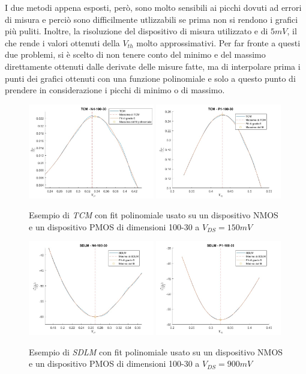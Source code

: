 \documentclass[12pt, letterpaper]{book}
\begin{document}
I due metodi appena esposti, però, sono molto sensibili ai picchi dovuti ad errori di misura e perciò sono difficilmente utlizzabili se prima non si rendono i grafici più puliti. Inoltre, la risoluzione del dispositivo di misura utilizzato e di $5 mV$, il che rende i valori ottenuti della $V_{th}$ molto approssimativi.
Per far fronte a questi due problemi, si è scelto di non tenere conto del minimo e del massimo direttamente ottenuti dalle derivate delle misure fatte, ma di interpolare prima i punti dei grafici ottenuti con una funzione polinomiale e solo a questo punto di prendere in considerazione i picchi di minimo o di massimo. \\

\begin{figure}[h!]
\centering
 \includegraphics[width=0.49\textwidth]{TCM-N4-100-30}
 \includegraphics[width=0.49\textwidth]{TCM-P1-100-30}
 \caption{Esempio di \emph{TCM} con fit polinomiale usato su un dispositivo NMOS e un dispositivo PMOS di dimensioni 100-30 a $V_{DS} = 150 mV$}
 \includegraphics[width=0.49\textwidth]{SDLM-N4-100-30}
 \includegraphics[width=0.49\textwidth]{SDLM-P1-100-30}
 \caption{Esempio di \emph{SDLM} con fit polinomiale usato su un dispositivo NMOS e un dispositivo PMOS di dimensioni 100-30 a $V_{DS} = 900 mV$}
\end{figure}
\end{document}
